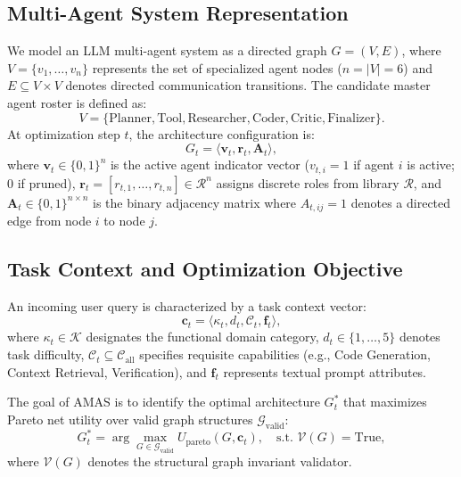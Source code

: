 \documentclass[conference]{IEEEtran}
\begin{document}
\subsection{Multi-Agent System Representation}
We model an LLM multi-agent system as a directed graph $G = (V, E)$, where $V = \{v_1, \dots, v_n\}$ represents the set of specialized agent nodes ($n = |V| = 6$) and $E \subseteq V \times V$ denotes directed communication transitions. The candidate master agent roster is defined as:
\begin{equation}
V = \{\text{Planner}, \text{Tool}, \text{Researcher}, \text{Coder}, \text{Critic}, \text{Finalizer}\}.
\end{equation}
At optimization step $t$, the architecture configuration is:
\begin{equation}
G_t = \langle \mathbf{v}_t, \mathbf{r}_t, \mathbf{A}_t \rangle,
\end{equation}
where $\mathbf{v}_t \in \{0, 1\}^n$ is the active agent indicator vector ($v_{t,i} = 1$ if agent $i$ is active; 0 if pruned), $\mathbf{r}_t = [r_{t,1}, \dots, r_{t,n}] \in \mathcal{R}^n$ assigns discrete roles from library $\mathcal{R}$, and $\mathbf{A}_t \in \{0, 1\}^{n \times n}$ is the binary adjacency matrix where $A_{t,ij} = 1$ denotes a directed edge from node $i$ to node $j$.

\subsection{Task Context and Optimization Objective}
An incoming user query is characterized by a task context vector:
\begin{equation}
\mathbf{c}_t = \langle \kappa_t, d_t, \mathcal{C}_t, \mathbf{f}_t \rangle,
\label{eq:context}
\end{equation}
where $\kappa_t \in \mathcal{K}$ designates the functional domain category, $d_t \in \{1, \dots, 5\}$ denotes task difficulty, $\mathcal{C}_t \subseteq \mathcal{C}_{\mathrm{all}}$ specifies requisite capabilities (e.g., Code Generation, Context Retrieval, Verification), and $\mathbf{f}_t$ represents textual prompt attributes.

The goal of AMAS is to identify the optimal architecture $G_t^*$ that maximizes Pareto net utility over valid graph structures $\mathcal{G}_{\mathrm{valid}}$:
\begin{equation}
G_t^* = \arg\max_{G \in \mathcal{G}_{\mathrm{valid}}} U_{\mathrm{pareto}}(G, \mathbf{c}_t), \quad \text{s.t. } \mathcal{V}(G) = \text{True},
\label{eq:optimization}
\end{equation}
where $\mathcal{V}(G)$ denotes the structural graph invariant validator.
\end{document}
